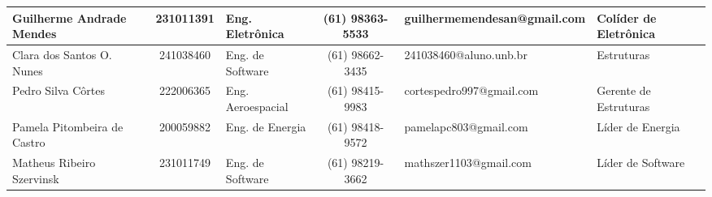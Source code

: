 \begin{landscape}
\begin{table}[htpb]
\begin{tabular}{|l|c|l|c|l|l|}
Guilherme Andrade Mendes & 231011391 & Eng. Eletrônica & (61) 98363-5533 & guilhermemendesan@gmail.com & Colíder de Eletrônica \\ \hline
Clara dos Santos O. Nunes & 241038460 & Eng. de Software & (61) 98662-3435 & 241038460@aluno.unb.br & Estruturas \\ \hline
Pedro Silva Côrtes & 222006365 & Eng. Aeroespacial & (61) 98415-9983 & cortespedro997@gmail.com & Gerente de Estruturas \\ \hline
Pamela Pitombeira de Castro & 200059882 & Eng. de Energia & (61) 98418-9572 & pamelapc803@gmail.com & Líder de Energia \\ \hline
Matheus Ribeiro Szervinsk & 231011749 & Eng. de Software & (61) 98219-3662 & mathszer1103@gmail.com & Líder de Software \\ \hline
\end{tabular}
\end{table}

\newpage %


\end{landscape}
